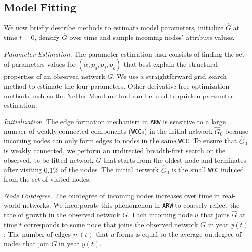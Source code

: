 \subsection{Model Fitting}
\label{sub:Model Fitting}

We now briefly describe methods to estimate model parameters,
initialize $\hat{G}$ at time ${t=0}$, densify $\hat{G}$
over time and sample incoming nodes' attribute values.

\textit{Parameter Estimation}.
The parameter estimation task consists of finding the set of
parameters values for $(\alpha, p_a, p_j, p_o)$ that best explain the structural properties
of an observed network $G$. We use a straightforward grid search method to estimate
the four parameters. Other derivative-free optimization methods such as the Nelder-Mead \cite{nelder1965simplex}
method can be used to quicken parameter estimation.

\textit{Initialization}. The edge formation mechanism in \texttt{ARW} is
sensitive to a large number of weakly connected components (\texttt{WCC}s) in the
initial network $\hat{G}_0$ because incoming nodes can only form edges to nodes
in the same \texttt{WCC}. To ensure that $\hat{G}_0$ is weakly
connected, we perform an undirected breadth-first search on the observed,
to-be-fitted network $G$ that starts from the oldest node and terminates after
visiting $0.1\%$ of the nodes. The initial network $\hat{G}_0$ is the small \texttt{WCC}
induced from the set of visited nodes.

\textit{Node Outdegree}.
The outdegree of incoming nodes increases over time in real-world networks.
We incorporate this phenomenon in \texttt{ARW}
to coarsely reflect the rate of growth in the observed network $G$.
Each incoming node $u$ that joins $\hat{G}$ at time $t$ corresponds to some
node that joins the observed network $G$ in year $y(t)$; The number of edges $m(t)$
that $u$ forms is equal to the average outdegree of nodes that join $G$ in year $y(t)$.

